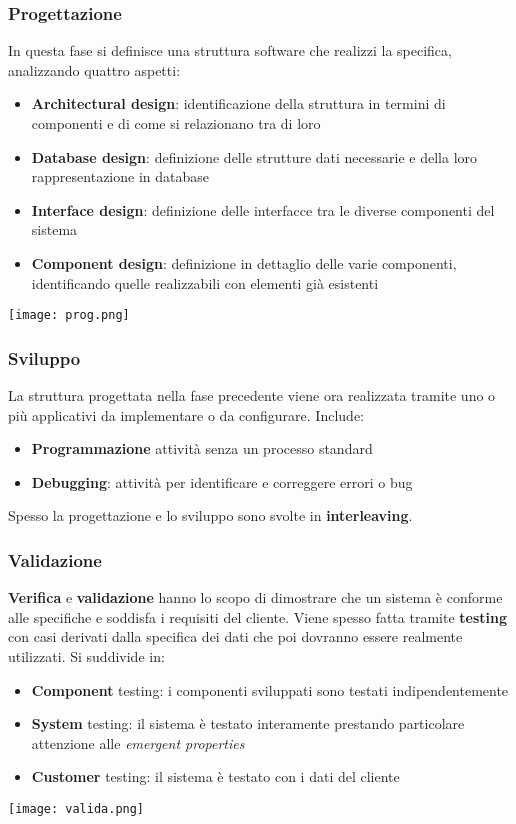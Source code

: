 \subsubsection{Progettazione}
In questa fase si definisce una struttura software che realizzi la specifica, analizzando quattro aspetti:
\begin{itemize}
	\item \textbf{Architectural design}: identificazione della struttura in termini di componenti e di come si relazionano tra di loro
	\item \textbf{Database design}: definizione delle strutture dati necessarie e della loro rappresentazione in database
	\item \textbf{Interface design}: definizione delle interfacce tra le diverse componenti del sistema
	\item \textbf{Component design}: definizione in dettaglio delle varie componenti, identificando quelle realizzabili con elementi già esistenti
\end{itemize}
\begin{center}
	\texttt{[image: prog.png]}
\end{center}

\subsubsection{Sviluppo}
La struttura progettata nella fase precedente viene ora realizzata tramite uno o più applicativi da implementare o da configurare. Include:
\begin{itemize}
	\item \textbf{Programmazione} attività senza un processo standard
	\item \textbf{Debugging}: attività per identificare e correggere errori o bug
\end{itemize}
Spesso la progettazione e lo sviluppo sono svolte in \textbf{interleaving}.

\subsubsection{Validazione}
\textbf{Verifica} e \textbf{validazione} hanno lo scopo di dimostrare che un sistema è conforme alle specifiche e soddisfa i requisiti del cliente. Viene spesso fatta tramite \textbf{testing} con casi derivati dalla specifica dei dati che poi dovranno essere realmente utilizzati. Si suddivide in:
\begin{itemize}
	\item \textbf{Component} testing: i componenti sviluppati sono testati indipendentemente
	\item \textbf{System} testing: il sistema è testato interamente prestando particolare attenzione alle \textit{emergent properties}
	\item \textbf{Customer} testing: il sistema è testato con i dati del cliente
\end{itemize}
\begin{center}
	\texttt{[image: valida.png]}
\end{center}

